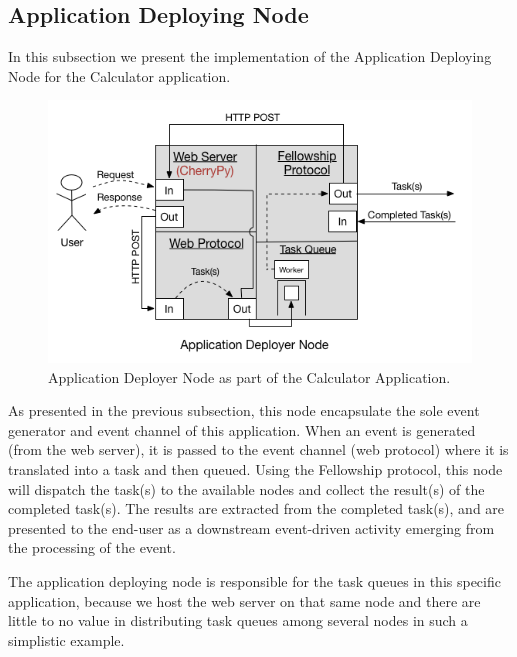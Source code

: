 \documentclass[12pt, titlepage]{uo_temp}
\begin{document}
     \subsection{Application Deploying Node}\label{impl_calc_appd}
     In this subsection we present the implementation of the Application Deploying Node
     for the Calculator application.
  
     \begin{figure}[h!]
       \centering
       \includegraphics[width=125mm]{images/calc_app_dep.png}
       \caption{Application Deployer Node as part of the Calculator Application.}
     \end{figure}
     As presented in the previous subsection, this node encapsulate the sole event
     generator and event channel of this application. When an event is generated (from the
     web server), it is passed to the event channel (web protocol) where it is translated
     into a task and then queued. Using the Fellowship protocol, this node will dispatch
     the task(s) to the available nodes and collect the result(s) of the completed
     task(s). The results are extracted from the completed task(s), and are presented to
     the end-user as a downstream event-driven activity emerging from the processing of
     the event.
     
     The application deploying node is responsible for the task queues in this specific
     application, because we host the web server on that same node and there are little to
     no value in distributing task queues among several nodes in such a simplistic example.  
\end{document}
